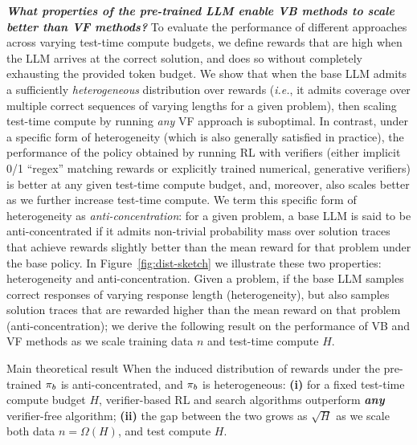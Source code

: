 \emph{\textbf{What properties of the pre-trained LLM enable VB methods to scale better than VF methods?}} To evaluate the performance of different approaches across varying test-time compute budgets, we define rewards that are high when the LLM arrives at the correct solution, and does so without completely exhausting the provided token budget. 
We show that when the base LLM admits a sufficiently \emph{heterogeneous} distribution over rewards (\textit{i.e.}, it admits coverage over multiple correct sequences of varying lengths for a given problem), then scaling test-time compute by running \emph{any} VF approach is suboptimal. In contrast, under a specific form of heterogeneity (which is also generally satisfied in practice), the performance of the policy obtained by running RL with verifiers (either implicit 0/1 ``regex'' matching rewards or explicitly trained numerical, generative verifiers) is better at any given test-time compute budget, and, moreover, also scales better as we further increase test-time compute. We term this specific form of heterogeneity as  \emph{anti-concentration}: for a given problem, a base LLM is said to be anti-concentrated if it admits  non-trivial probability mass over solution traces that achieve rewards slightly better than the mean reward for that problem under the base policy. 
In Figure~\ref{fig:dist-sketch} we illustrate these two properties: heterogeneity and anti-concentration. Given a problem, if the base LLM samples correct responses of varying response length (heterogeneity), but also samples solution traces that are rewarded higher than the mean reward on that problem  (anti-concentration);  we derive the following result on the performance of VB and VF methods as we scale training data $n$ and test-time compute $H$.   
















\begin{AIbox}{Main theoretical result}
When the induced distribution of rewards under the pre-trained $\pi_b$ is anti-concentrated, and $\pi_b$ is heterogeneous: \textbf{(i)} for a fixed test-time compute budget $H$, verifier-based RL and search algorithms outperform \textbf{\emph{any}} verifier-free algorithm; \textbf{(ii)} the gap between the two grows as $\sqrt{H}$ as we scale both data $n = \Omega(H)$, and test compute $H$.
\end{AIbox}






